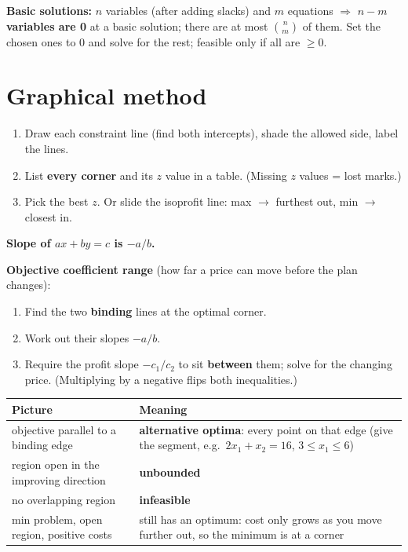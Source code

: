 \documentclass[10pt,a4paper]{article}
\newcommand{\thead}[1]{\textbf{#1}}
\begin{document}
\textbf{Basic solutions:} $n$ variables (after adding slacks) and $m$ equations $\Rightarrow$ \textbf{$n-m$ variables are 0} at a basic solution; there are at most $\binom{n}{m}$ of them. Set the chosen ones to 0 and solve for the rest; feasible only if all are $\geq 0$.

\section{Graphical method}

\begin{enumerate}
  \item Draw each constraint line (find both intercepts), shade the allowed side, label the lines.
  \item List \textbf{every corner} and its $z$ value in a table. (Missing $z$ values = lost marks.)
  \item Pick the best $z$. Or slide the isoprofit line: max $\to$ furthest out, min $\to$ closest in.
\end{enumerate}

\textbf{Slope of $ax + by = c$ is $-a/b$.}

\textbf{Objective coefficient range} (how far a price can move before the plan changes):
\begin{enumerate}
  \item Find the two \textbf{binding} lines at the optimal corner.
  \item Work out their slopes $-a/b$.
  \item Require the profit slope $-c_1/c_2$ to sit \textbf{between} them; solve for the changing price. (Multiplying by a negative flips both inequalities.)
\end{enumerate}

\begin{tabularx}{\linewidth}{@{}l L@{}}
\toprule
\thead{Picture} & \thead{Meaning} \\
\midrule
objective parallel to a binding edge & \textbf{alternative optima}: every point on that edge (give the segment, e.g.\ $2x_1 + x_2 = 16$, $3 \leq x_1 \leq 6$) \\
region open in the improving direction & \textbf{unbounded} \\
no overlapping region & \textbf{infeasible} \\
min problem, open region, positive costs & still has an optimum: cost only grows as you move further out, so the minimum is at a corner \\
\bottomrule
\end{tabularx}
\end{document}
